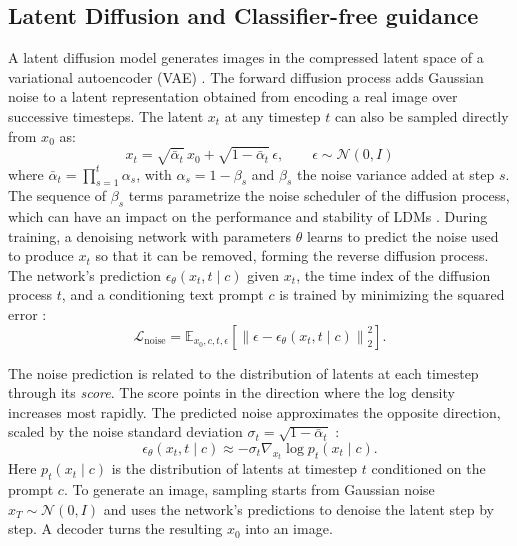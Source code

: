 \documentclass{article} %
\begin{document}
\subsection{Latent Diffusion and Classifier-free guidance}
A latent diffusion model \citep{rombach2022high} generates images in the compressed latent space of a variational autoencoder (VAE) \citep{kingma2013auto}. The forward diffusion process adds Gaussian noise to a latent representation obtained from encoding a real image over successive timesteps. The latent $x_t$ at any timestep $t$ can
also be sampled directly from $x_0$ as:
\begin{equation}
x_t
= \sqrt{\bar\alpha_t}\,x_0
+ \sqrt{1-\bar\alpha_t}\,\epsilon,
\qquad \epsilon\sim\mathcal{N}(0,I)
\label{eq:forward}
\end{equation}
where $\bar\alpha_t=\prod_{s=1}^{t}\alpha_s$, with
$\alpha_s=1-\beta_s$ and $\beta_s$ the noise variance added at step $s$. The sequence of $\beta_s$ terms parametrize the noise scheduler of the diffusion process, which can have an impact on the performance and stability of LDMs \citep{hang2025improved}. During training, a denoising network with parameters $\theta$ learns to predict the noise used to produce $x_t$ so that it can be removed, forming the reverse diffusion process. The network's prediction $\epsilon_\theta(x_t,t\mid c)$ given $x_t$, the time index of the diffusion process $t$, and a conditioning text prompt $c$ is trained by minimizing the squared error \citep{ho2020denoising}:
\begin{equation}
\mathcal L_{\mathrm{noise}}
=
\mathbb E_{x_0,c,t,\epsilon}
\left[
\left\|\epsilon-\epsilon_\theta(x_t,t\mid c)\right\|_2^2
\right].
\label{eq:objective}
\end{equation}

The noise prediction is related to the distribution of latents at each
timestep through its \emph{score}. The score points in the direction
where the log density increases most rapidly. The predicted noise
approximates the opposite direction, scaled by the noise standard
deviation $\sigma_t=\sqrt{1-\bar\alpha_t}$ \citep{song2021scorebased}:
\begin{equation}
\epsilon_\theta(x_t,t\mid c)
\approx
-\sigma_t\nabla_{x_t}\log p_t(x_t\mid c).
\label{eq:score}
\end{equation}
Here $p_t(x_t\mid c)$ is the distribution of latents at timestep $t$
conditioned on the prompt $c$. To generate an image, sampling starts from Gaussian noise
$x_T\sim\mathcal{N}(0,I)$ and uses the network's predictions to denoise
the latent step by step. A decoder turns the resulting $x_0$ into an
image. 
\end{document}
